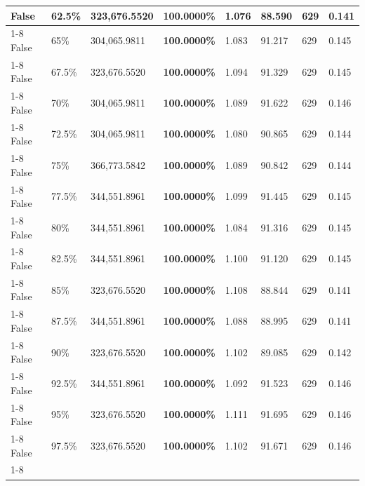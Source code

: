\begin{table}[H]
\begin{tabular}{lllrllll}
False & 62.5\% & 323,676.5520 & \bfseries \color{red} 100.0000\% & 1.076 & 88.590 & 629 & 0.141 \\
\cline{1-8} \cline{2-8}
False & 65\% & 304,065.9811 & \bfseries \color{red} 100.0000\% & 1.083 & 91.217 & 629 & 0.145 \\
\cline{1-8} \cline{2-8}
False & 67.5\% & 323,676.5520 & \bfseries \color{red} 100.0000\% & 1.094 & 91.329 & 629 & 0.145 \\
\cline{1-8} \cline{2-8}
False & 70\% & 304,065.9811 & \bfseries \color{red} 100.0000\% & 1.089 & 91.622 & 629 & 0.146 \\
\cline{1-8} \cline{2-8}
False & 72.5\% & 304,065.9811 & \bfseries \color{red} 100.0000\% & 1.080 & 90.865 & 629 & 0.144 \\
\cline{1-8} \cline{2-8}
False & 75\% & 366,773.5842 & \bfseries \color{red} 100.0000\% & 1.089 & 90.842 & 629 & 0.144 \\
\cline{1-8} \cline{2-8}
False & 77.5\% & 344,551.8961 & \bfseries \color{red} 100.0000\% & 1.099 & 91.445 & 629 & 0.145 \\
\cline{1-8} \cline{2-8}
False & 80\% & 344,551.8961 & \bfseries \color{red} 100.0000\% & 1.084 & 91.316 & 629 & 0.145 \\
\cline{1-8} \cline{2-8}
False & 82.5\% & 344,551.8961 & \bfseries \color{red} 100.0000\% & 1.100 & 91.120 & 629 & 0.145 \\
\cline{1-8} \cline{2-8}
False & 85\% & 323,676.5520 & \bfseries \color{red} 100.0000\% & 1.108 & 88.844 & 629 & 0.141 \\
\cline{1-8} \cline{2-8}
False & 87.5\% & 344,551.8961 & \bfseries \color{red} 100.0000\% & 1.088 & 88.995 & 629 & 0.141 \\
\cline{1-8} \cline{2-8}
False & 90\% & 323,676.5520 & \bfseries \color{red} 100.0000\% & 1.102 & 89.085 & 629 & 0.142 \\
\cline{1-8} \cline{2-8}
False & 92.5\% & 344,551.8961 & \bfseries \color{red} 100.0000\% & 1.092 & 91.523 & 629 & 0.146 \\
\cline{1-8} \cline{2-8}
False & 95\% & 323,676.5520 & \bfseries \color{red} 100.0000\% & 1.111 & 91.695 & 629 & 0.146 \\
\cline{1-8} \cline{2-8}
False & 97.5\% & 323,676.5520 & \bfseries \color{red} 100.0000\% & 1.102 & 91.671 & 629 & 0.146 \\
\cline{1-8} \cline{2-8}
\bottomrule
\end{tabular}
\end{table}
